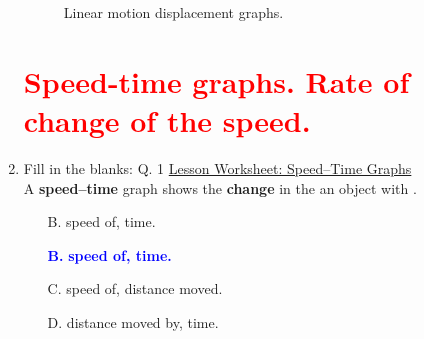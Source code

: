 \documentclass[A4,12pt]{article}
\begin{document}
\begin{enumerate}[label=\bfseries (\arabic*)]
\begin{figure}[H]
    \caption{Linear motion displacement graphs.}
    \label{fig:descript}
\end{figure}














\section*{\textcolor{red}{Speed-time graphs. Rate of change of the speed.}}







\item Fill in the blanks: \cite{Nagwa} Q. 1 \href{https://www.nagwa.com/en/worksheets/257191315239/}{Lesson Worksheet: Speed–Time Graphs}\\
A \textbf{speed–time} graph shows the \textbf{change} in the  \underline{\hspace{3cm}} an object with \underline{\hspace{3cm}}.
%
\begin{itemize}
    \item[B.] speed of, time.
    \item[\textcolor{blue}{\bf B.}] \textcolor{blue}{\bf speed of, time.}
    \item[C.] speed of, distance moved.
    \item[D.] distance moved by, time.
\end{itemize}
%













\end{enumerate}
\end{document}
